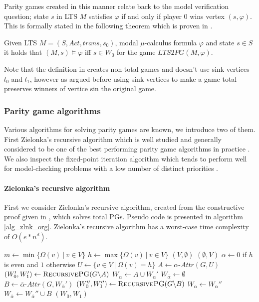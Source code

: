 Parity games created in this manner relate back to the model verification question; state $s$ in LTS $M$ satisfies $\varphi$ if and only if player $0$ wins vertex $(s, \varphi)$. This is formally stated in the following theorem which is proven in \cite{Bradfield2018}.
\begin{theorem}
	\label{the_LTS_PG_REL}Given LTS $M = (S, Act, trans, s_0)$, modal $\mu$-calculus formula $\varphi$ and state $s \in S$ it holds that $(M, s) \models \varphi$ iff $s \in W_0$ for the game $LTS2PG(M, \varphi)$.
\end{theorem}
Note that the definition in \cite{Bradfield2018} creates non-total games and doesn't use sink vertices $l_0$ and $l_1$, however as argued before using sink vertices to make a game total preserves winners of vertice sin the original game.

\subsubsection{Parity game algorithms}
Various algorithms for solving parity games are known, we introduce two of them. First Zielonka's recursive algorithm which is well studied and generally considered to be one of the best performing parity game algorithms in practice \cite{Oink,SolvingPGInPractice}. We also inspect the fixed-point iteration algorithm which tends to perform well for model-checking problems with a low number of distinct priorities \cite{BDDSolvingPG}.

\paragraph{Zielonka's recursive algorithm}
First we consider Zielonka's recursive algorithm, created from the constructive proof given in \cite{ZIELONKA1998135}, which solves total PGs. Pseudo code is presented in algorithm \ref{alg_zlnk_org}. Zielonka's recursive algorithm has a worst-case time complexity of $O(e*n^d)$.
\begin{algorithm}
	\caption{$\textsc{RecursivePG}(\textit{PG } G = (V,V_0,V_1, E, \Omega))$}
	\label{alg_zlnk_org}
	\begin{algorithmic}[1]
		\State $m \gets \min\{ \Omega(v)\ |\ v \in V\}$
		\State $h \gets\max\{ \Omega(v)\ |\ v \in V\}$
		\State \Return $(V,\emptyset)$
		\Else
		\State \Return $(\emptyset, V)$
		\EndIf
		\EndIf
		\State $\alpha \gets 0$ if $h$ is even and $1$ otherwise
		\State $U \gets \{v \in V\ |\ \Omega(v) = h\}$
		\State $A \gets \alpha\textit{-Attr}(G, U)$
		\State $(W_0', W_1') \gets \textsc{RecursivePG}(G \backslash A)$
		\State $W_\alpha \gets A \cup W_\alpha'$
		\State $W_{\overline{\alpha}} \gets \emptyset$
		\Else
		\State $B \gets \overline{\alpha}\textit{-Attr}(G,W_{\overline{\alpha}}')$
		\State $(W_0'', W_1'') \gets \textsc{RecursivePG}(G \backslash B)$
		\State $W_\alpha \gets W_\alpha''$
		\State $W_{\overline{\alpha}} \gets W_{\overline{\alpha}}'' \cup B$
		\EndIf
		\State \Return $(W_0, W_1)$
	\end{algorithmic}
\end{algorithm}

